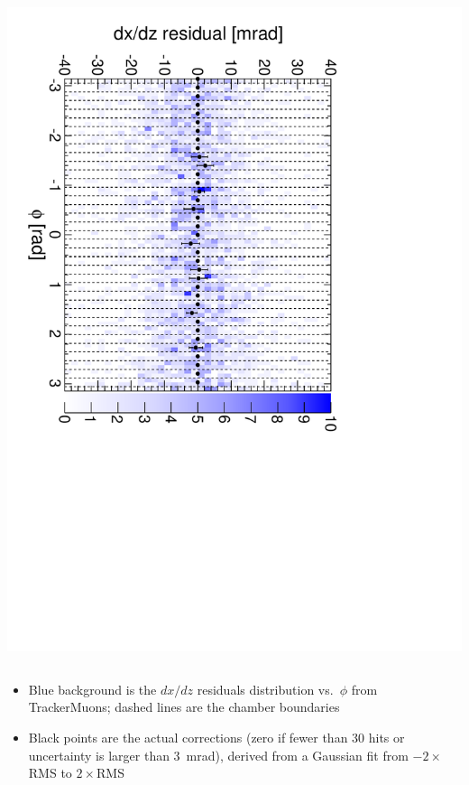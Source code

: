 \documentclass[compress]{beamer}
\begin{document}
\begin{frame}
\begin{columns}
\includegraphics[height=\linewidth, angle=90]{iter02_mem13.pdf}
\end{columns}

\begin{itemize}
\item Blue background is the $dx/dz$ residuals distribution
  vs.\ $\phi$ from TrackerMuons; dashed lines are the chamber boundaries
\item Black points are the actual corrections (zero if fewer than 30
  hits or uncertainty is larger than 3~mrad), derived from a Gaussian
  fit from $-2\times$RMS to $2\times$RMS
\end{itemize}
\end{frame}
\end{document}

